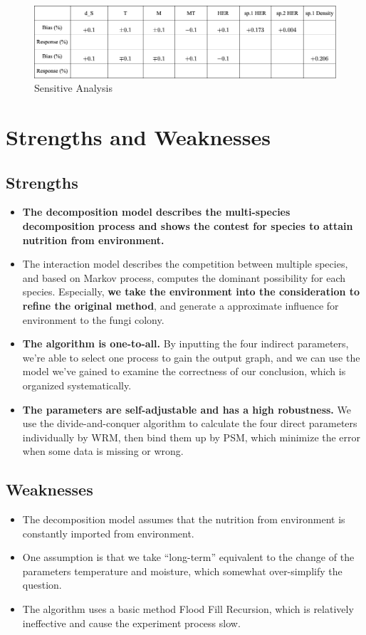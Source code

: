 \documentclass[12pt]{article}
\begin{document}
\begin{figure}[H]
	\small
	\centering
	\includegraphics[width=15cm]{./pictures/t.png}
	\caption{Sensitive Analysis}\label{jj}
\end{figure}

\section{Strengths and Weaknesses}
\subsection{Strengths}
\begin{itemize}
	\item \textbf { The decomposition model describes the multi-species decomposition process and shows the contest for species to attain nutrition from environment.}
	\item The interaction model describes the competition between multiple species, and based on Markov process, computes the dominant possibility for each species. Especially, \textbf{we take the environment into the consideration to refine the original method}, and generate a approximate influence for environment to the fungi colony.
	\item \textbf{The algorithm is one-to-all.} By inputting the four indirect parameters, we’re able to select one process to gain the output graph, and we can use the model we’ve gained to examine the correctness of our conclusion, which is organized systematically.
	\item \textbf{The parameters are self-adjustable and has a high robustness.} We use the divide-and-conquer algorithm to calculate the four direct parameters individually by WRM, then bind them up by PSM, which minimize the error when some data is missing or wrong.

\end{itemize}
\subsection{Weaknesses}
\begin{itemize}
	\item The decomposition model assumes that the nutrition from environment is constantly imported from environment.
	\item One assumption is that we take “long-term” equivalent to the change of the parameters temperature and moisture, which somewhat over-simplify the question.
	\item The algorithm uses a basic method Flood Fill Recursion, which is relatively ineffective and cause the experiment process slow.
\end{itemize}
\end{document}
